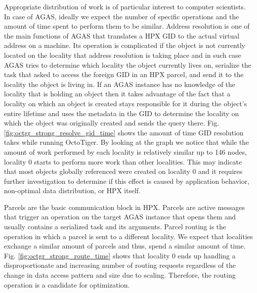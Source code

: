 Appropriate distribution of work is of particular interest to computer
scientists. In case of AGAS, ideally we expect the number of specific
operations and the amount of time spent to perform them to be similar. Address
resolution is one of the main functions of AGAS that translates a HPX GID to
the actual virtual address on a machine. Its operation is complicated if the
object is not currently located on the locality that address resolution is taking
place and in such case AGAS tries to determine which locality the object
currently lives on, serialize the task that asked to access the foreign GID in
an HPX parcel, and send it to the locality the object is living in. If an AGAS
instance has no knowledge of the locality that is holding an object then it
takes advantage of the fact that a locality on which an object is created stays
responsible for it during the object's entire lifetime and uses the metadata in
the GID to determine the locality on which the object was originally created and
sends the query there. Fig. \ref{fig:octgr_strong_resolve_gid_time} shows the
amount of time GID resolution takes while running OctoTiger. By looking at
the graph we notice that while the amount of work performed by each
locality is relatively similar up to 146 nodes, locality 0 starts to perform
more work than other localities. This may indicate that most objects globally
referenced were created on locality 0 and it requires further investigation to
determine if this effect is caused by application behavior, non-optimal data
distribution, or HPX itself.

Parcels are the basic communication block in HPX. Parcels are active messages
that trigger an operation on the target AGAS instance that opens them and
usually contains a serialized task and its arguments. Parcel routing is the
operation in which a parcel is sent to a different locality. We expect that localities exchange a similar amount of parcels and thus, spend a similar amount of time. Fig.
\ref{fig:octgr_strong_route_time} shows that locality 0 ends up handling a
disproportionate and increasing number of routing requests regardless of the
change in data access pattern and size due to scaling. Therefore, the routing
operation is a candidate for optimization.

